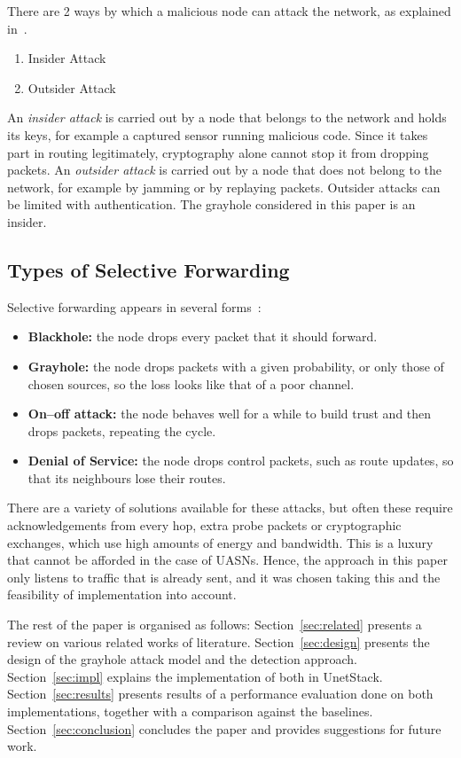 \documentclass[conference]{IEEEtran}
\begin{document}
There are 2 ways by which a malicious node can attack the network, as explained in~\cite{karlof,domingo}.
\begin{enumerate}
\item Insider Attack
\item Outsider Attack
\end{enumerate}
An \emph{insider attack} is carried out by a node that belongs to the network and holds its keys, for example a captured sensor running malicious code. Since it takes part in routing legitimately, cryptography alone cannot stop it from dropping packets. An \emph{outsider attack} is carried out by a node that does not belong to the network, for example by jamming or by replaying packets. Outsider attacks can be limited with authentication. The grayhole considered in this paper is an insider.

\subsection{Types of Selective Forwarding}
Selective forwarding appears in several forms~\cite{karlof,jiang}:
\begin{itemize}
\item \textbf{Blackhole:} the node drops every packet that it should forward.
\item \textbf{Grayhole:} the node drops packets with a given probability, or only those of chosen sources, so the loss looks like that of a poor channel.
\item \textbf{On--off attack:} the node behaves well for a while to build trust and then drops packets, repeating the cycle.
\item \textbf{Denial of Service:} the node drops control packets, such as route updates, so that its neighbours lose their routes.
\end{itemize}
There are a variety of solutions available for these attacks, but often these require acknowledgements from every hop, extra probe packets or cryptographic exchanges, which use high amounts of energy and bandwidth. This is a luxury that cannot be afforded in the case of UASNs. Hence, the approach in this paper only listens to traffic that is already sent, and it was chosen taking this and the feasibility of implementation into account.

The rest of the paper is organised as follows: Section~\ref{sec:related} presents a review on various related works of literature. Section~\ref{sec:design} presents the design of the grayhole attack model and the detection approach. Section~\ref{sec:impl} explains the implementation of both in UnetStack. Section~\ref{sec:results} presents results of a performance evaluation done on both implementations, together with a comparison against the baselines. Section~\ref{sec:conclusion} concludes the paper and provides suggestions for future work.
\end{document}
